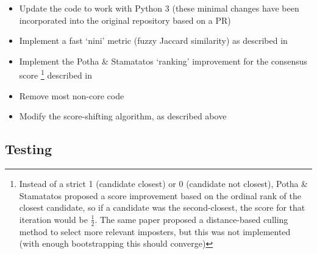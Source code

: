 \documentclass[
    hf
]{ceurart}
\begin{document}
\begin{itemize}
    \item Update the code to work with Python 3 (these minimal changes have been
          incorporated into the original repository based on a PR)
    \item Implement a fast `nini' metric (fuzzy Jaccard similarity) as described in \cite{nini_aa}
    \item Implement the Potha \& Stamatatos `ranking'
          improvement for the consensus score%
          \footnote{ Instead of a strict 1 (candidate closest) or 0 (candidate
              not closest), Potha \& Stamatatos proposed a score improvement
              based on the ordinal rank of the closest candidate, so if a
              candidate was the second-closest, the score for that iteration
              would be $\frac{1}{2}$. The same paper proposed a distance-based
              culling method to select more relevant imposters, but this was not
              implemented (with enough bootstrapping this should converge)}
          described in \cite{potha_improved_gi}
    \item Remove most non-core code
    \item Modify the score-shifting algorithm, as described above
\end{itemize}

\subsection{Testing}
\end{document}
